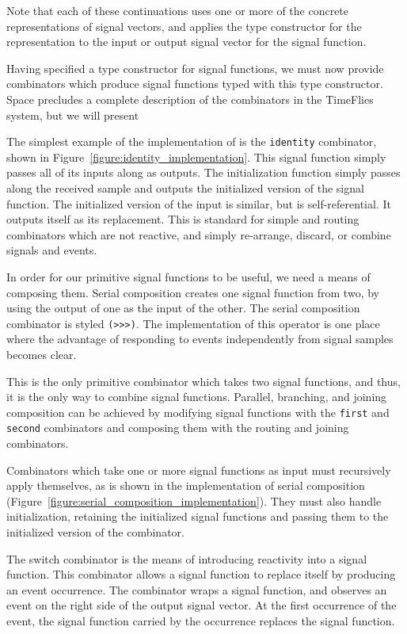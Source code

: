 Note that each of these continuations uses one or more of the concrete
representations of signal vectors, and applies the type constructor for the
representation to the input or output signal vector for the signal function.

Having specified a type constructor for signal functions, we must now provide
combinators which produce signal functions typed with this type constructor.
Space precludes a complete description of the combinators in the TimeFlies
system, but we will present 

The simplest example of the implementation of is the {\tt identity} combinator,
shown in Figure~\ref{figure:identity_implementation}. This signal function
simply passes all of its inputs along as outputs. The initialization function
simply passes along the received sample and outputs the initialized version of
the signal function. The initialized version of the input is similar, but is
self-referential. It outputs itself as its replacement. This is standard for
simple and routing combinators which are not reactive, and simply re-arrange,
discard, or combine signals and events.

In order for our primitive signal functions to be useful, we need a means of
composing them. Serial composition creates one signal function from two, by
using the output of one as the input of the other. The serial composition
combinator is styled {\tt (>>>)}. The implementation of this operator is one
place where the advantage of responding to events independently from signal
samples becomes clear. 

This is the only primitive combinator which takes two signal functions, and
thus, it is the only way to combine signal functions. Parallel, branching, and
joining composition can be achieved by modifying signal functions with the
{\tt first} and {\tt second} combinators and composing them with the
routing and joining combinators.

Combinators which take one or more signal functions as input must recursively
apply themselves, as is shown in the implementation of serial composition
(Figure~\ref{figure:serial_composition_implementation}). They must also
handle initialization, retaining the initialized signal functions and passing
them to the initialized version of the combinator.

The switch combinator is the means of introducing reactivity into a signal
function. This combinator allows a signal function to replace itself by
producing an event occurrence. The combinator wraps a signal function, and 
observes an event on the right side of the output signal vector. At the first
occurrence of the event, the signal function carried by the occurrence replaces
the signal function. 


